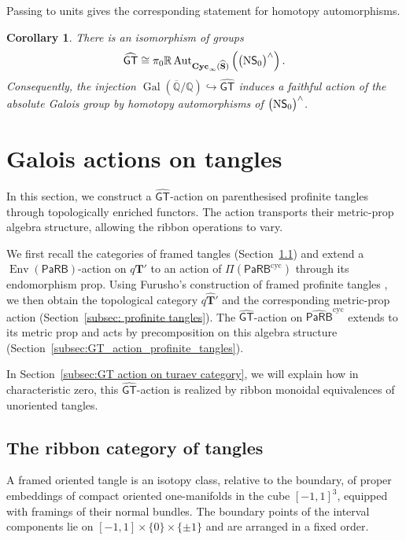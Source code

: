 \documentclass{amsart}
\newcommand{\bT}{\mathbf{T}}
\newcommand{\sSet}{\mathbf{S}}
\newcommand{\PaRB}{\mathsf{PaRB}}
\newcommand{\Cyc}{\mathbf{Cyc}}
\newcommand{\Aut}{\operatorname{Aut}}
\newcommand{\Env}{\operatorname{Env}}
\newcommand{\nerve}{\textnormal{N}}
\newcommand{\GT}{\widehat{\mathsf{GT}}}
\newtheorem{cor}[theorem]{Corollary}%
\theoremstyle{definition}
\numberwithin{equation}{section}
\begin{document}
Passing to units gives the corresponding statement for homotopy
automorphisms.

\begin{cor}
\label{cor:Galois_action_CB}
There is an isomorphism of groups
\[
\GT
\cong
\pi_0\mathbb R\Aut_{\Cyc_\infty(\widehat{\sSet})}
\left(
\bigl(\nerve\mathsf S_0\bigr)^{\wedge}
\right).
\]
Consequently, the injection
$\operatorname{Gal}(\overline{\mathbb Q}/\mathbb Q)\hookrightarrow
\GT$ induces a faithful action of the absolute Galois group by
homotopy automorphisms of
$\bigl(\nerve\mathsf S_0\bigr)^{\wedge}$.
\end{cor}

\section{Galois actions on tangles}
\label{sec: Galois action on tangles}

In this section, we construct a $\GT$-action on parenthesised profinite tangles through topologically enriched functors. The action transports their metric-prop algebra structure, allowing the ribbon operations to vary.

We first recall the categories of framed tangles (Section~\ref{subsec:tangles}) and extend a $\Env(\PaRB)$-action on $q\bT'$ to an action of
$\Pi(\PaRB^{\mathrm{cyc}})$ through its endomorphism prop. Using Furusho's construction of framed profinite tangles \cite{furusho_galois_2017}, we then obtain the topological category $q\widehat{\bT}'$ and the corresponding metric-prop action (Section~\ref{subsec: profinite tangles}). The $\GT$-action on $\widehat{\PaRB}^{\mathrm{cyc}}$ extends
to its metric prop and acts by precomposition on this algebra structure (Section~\ref{subsec:GT_action_profinite_tangles}).

In Section~\ref{subsec:GT action on turaev category}, we will explain how in characteristic zero, this $\GT$-action is
realized by ribbon monoidal equivalences of unoriented tangles.

\subsection{The ribbon category of tangles}
\label{subsec:tangles}

A framed oriented tangle is an isotopy class, relative to the
boundary, of proper embeddings of compact oriented one-manifolds
in the cube $[-1,1]^3$, equipped with framings of their normal
bundles. The boundary points of the interval components lie on
$[-1,1]\times\{0\}\times\{\pm1\}$ and are arranged in a fixed order.
\end{document}
